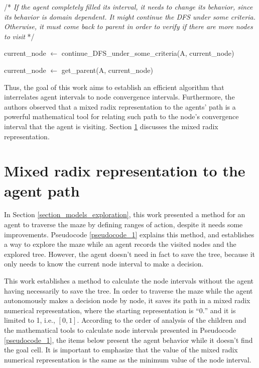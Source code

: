 \begin{algorithm}
\begin{algorithmic}
\EndIf

\State

\State /* \textit{If the agent completely filled its interval, it needs to change its behavior, since its}
\State \textit{behavior is domain dependent. It might continue the DFS under some criteria.}
\State \textit{Otherwise, it must come back to parent in order to verify if there are more nodes to}
\State \textit{visit} */


\State current\_node $\gets$ continue\_DFS\_under\_some\_criteria(A, current\_node)

\Else

\State current\_node $\gets$ get\_parent(A, current\_node)

\EndIf

\EndWhile

\end{algorithmic}
\end{algorithm}

Thus, the goal of this work aims to establish an efficient algorithm that interrelates agent intervals to node convergence intervals. Furthermore, the authors observed that a mixed radix representation to the agents' path is a powerful mathematical tool for relating such path to the node's convergence interval that the agent is visiting. Section \ref{section_models_mixed_radix} discusses the mixed radix representation.

\section{Mixed radix representation to the agent path}
\label{section_models_mixed_radix}
In Section \ref{section_models_exploration}, this work presented a method for an agent to traverse the maze by defining ranges of action, despite it needs some improvements. Pseudocode \ref{pseudocode_1} explains this method, and establishes a way to explore the maze while an agent records the visited nodes and the explored tree. However, the agent doesn't need in fact to save the tree, because it only needs to know the current node interval to make a decision.

This work establishes a method to calculate the node intervals without the agent having necessarily to save the tree. In order to traverse the maze while the agent autonomously makes a decision node by node, it saves its path in a mixed radix numerical representation, where the starting representation is ``$0.$'' and it is limited to 1, i.e., $[0,1]$. According to the order of analysis of the children and the mathematical tools to calculate node intervals presented in Pseudocode \ref{pseudocode_1}, the items below present the agent behavior while it doesn't find the goal cell. It is important to emphasize that the value of the mixed radix numerical representation is the same as the minimum value of the node interval.

